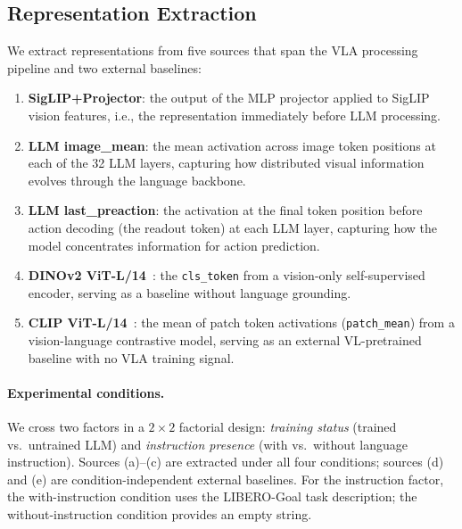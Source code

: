 \subsection{Representation Extraction}
\label{sec:repr_extraction}

We extract representations from five sources that span the VLA processing pipeline and two external baselines:

\begin{enumerate}[label=(\alph*),leftmargin=*,nosep]
  \item \textbf{SigLIP+Projector}: the output of the MLP projector applied to SigLIP vision features, i.e., the representation immediately before LLM processing.
  \item \textbf{LLM image\_mean}: the mean activation across image token positions at each of the 32 LLM layers, capturing how distributed visual information evolves through the language backbone.
  \item \textbf{LLM last\_preaction}: the activation at the final token position before action decoding (the readout token) at each LLM layer, capturing how the model concentrates information for action prediction.
  \item \textbf{DINOv2 ViT-L/14}~\cite{oquab2024_dinov2}: the \texttt{cls\_token} from a vision-only self-supervised encoder, serving as a baseline without language grounding.
  \item \textbf{CLIP ViT-L/14}~\cite{radford2021_clip}: the mean of patch token activations (\texttt{patch\_mean}) from a vision-language contrastive model, serving as an external VL-pretrained baseline with no VLA training signal.
\end{enumerate}

\paragraph{Experimental conditions.}
We cross two factors in a $2 \times 2$ factorial design: \emph{training status} (trained vs.\ untrained LLM) and \emph{instruction presence} (with vs.\ without language instruction).
Sources (a)--(c) are extracted under all four conditions; sources (d) and (e) are condition-independent external baselines.
For the instruction factor, the with-instruction condition uses the LIBERO-Goal task description; the without-instruction condition provides an empty string.

